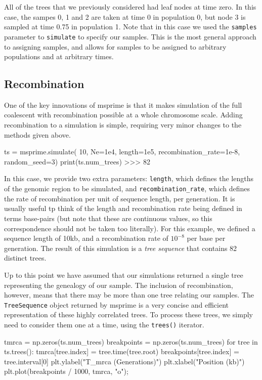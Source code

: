 \documentclass[graybox]{svmult}
\begin{document}
All of the trees that we previously considered had leaf nodes at time
zero. In this case, the sampes 0, 1 and 2 are taken at time 0 in
population 0, but node 3 is sampled at time 0.75 in population 1. Note
that in this case we used the \texttt{samples} parameter to
\texttt{simulate} to specify our samples. This is the most general
approach to assigning samples, and allows for samples to be assigned to
arbitrary populations and at arbitrary times.

\subsection{Recombination}\label{recombination}

One of the key innovations of msprime is that it makes simulation of the
full coalescent with recombination possible at a whole chromosome scale.
Adding recombination to a simulation is simple, requiring very minor
changes to the methods given above.

\begin{pythoncode}
ts = msprime.simulate(
    10, Ne=1e4, length=1e5, recombination_rate=1e-8, random_seed=3)
print(ts.num_trees)
>>> 82
\end{pythoncode}

    In this case, we provide two extra parameters: \texttt{length}, which
defines the lengths of the genomic region to be simulated, and
\texttt{recombination\_rate}, which defines the rate of recombination
per unit of sequence length, per generation. It is usually useful tp
think of the length and recombination rate being defined in terms
base-pairs (but note that these are continuous values, so this
correspondence should not be taken too literally). For this example, we
defined a sequence length of 10kb, and a recombination rate of
\(10^{-8}\) per base per generation. The result of this simulation is a
\emph{tree sequence} that contains 82 distinct trees.

Up to this point we have assumed that our simulations returned a single
tree representing the genealogy of our sample. The inclusion of
recombination, however, means that there may be more than one tree
relating our samples. The \texttt{TreeSequence} object returned by
msprime is a very concise and efficient representation of these highly
correlated trees. To process these trees, we simply need to consider
them one at a time, using the \texttt{trees()} iterator.

\begin{pythoncode}
tmrca = np.zeros(ts.num_trees)
breakpoints = np.zeros(ts.num_trees)
for tree in ts.trees():
    tmrca[tree.index] = tree.time(tree.root)
    breakpoints[tree.index] = tree.interval[0]
plt.ylabel("T_mrca (Generations)")
plt.xlabel("Position (kb)")
plt.plot(breakpoints / 1000, tmrca, "o");
\end{pythoncode}
\end{document}
